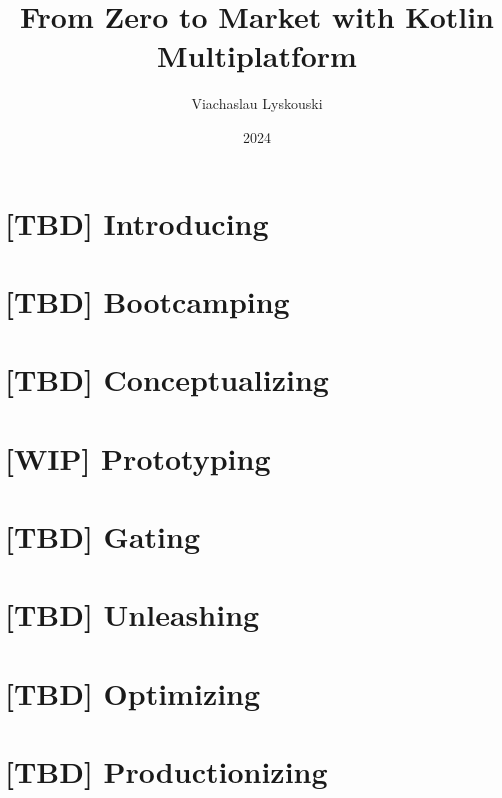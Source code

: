 \documentclass[12pt, a4paper, twoside]{extreport}
\author{Viachaslau Lyskouski}
\title{From Zero to Market with Kotlin Multiplatform}
\date{2024}
\begin{document}

\maketitle



\tableofcontents

\newpage
\section*{[TBD] Introducing}


\newpage
\section{[TBD] Bootcamping}




\newpage
\section{[TBD] Conceptualizing}


\newpage
\section{[WIP] Prototyping}



\newpage
\section{[TBD] Gating}


\newpage
\section{[TBD] Unleashing}


\newpage
\section{[TBD] Optimizing}


\newpage
\section{[TBD] Productionizing}

\end{document}
